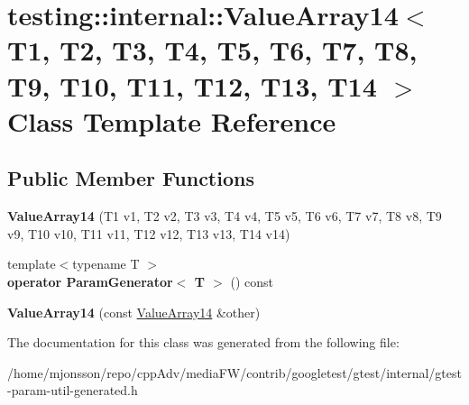 \hypertarget{classtesting_1_1internal_1_1ValueArray14}{}\section{testing\+:\+:internal\+:\+:Value\+Array14$<$ T1, T2, T3, T4, T5, T6, T7, T8, T9, T10, T11, T12, T13, T14 $>$ Class Template Reference}
\label{classtesting_1_1internal_1_1ValueArray14}
\subsection*{Public Member Functions}
\begin{DoxyCompactItemize}
\item 
\mbox{\label{classtesting_1_1internal_1_1ValueArray14_a07a09d64aba1260d403adc661546ce48}} 
{\bfseries Value\+Array14} (T1 v1, T2 v2, T3 v3, T4 v4, T5 v5, T6 v6, T7 v7, T8 v8, T9 v9, T10 v10, T11 v11, T12 v12, T13 v13, T14 v14)
\item 
\mbox{\label{classtesting_1_1internal_1_1ValueArray14_aef77c9d7520c7313e2af66fd79185698}} 
{\footnotesize template$<$typename T $>$ }\\{\bfseries operator Param\+Generator$<$ T $>$} () const
\item 
\mbox{\label{classtesting_1_1internal_1_1ValueArray14_a41d4f0e6d12c86df58b24992a06300dc}} 
{\bfseries Value\+Array14} (const \hyperlink{classtesting_1_1internal_1_1ValueArray14}{Value\+Array14} \&other)
\end{DoxyCompactItemize}


The documentation for this class was generated from the following file\+:\begin{DoxyCompactItemize}
\item 
/home/mjonsson/repo/cpp\+Adv/media\+F\+W/contrib/googletest/gtest/internal/gtest-\/param-\/util-\/generated.\+h\end{DoxyCompactItemize}
